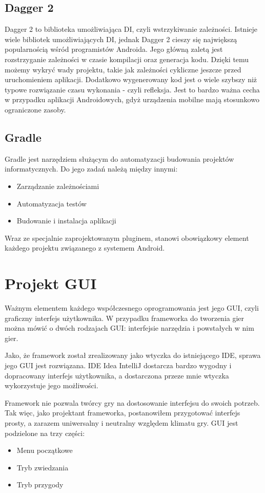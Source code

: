 \documentclass{xmgr}
\begin{document}
\section{Dagger 2}

Dagger 2 \cite{Dagger2:2017:Doc} to biblioteka umożliwiająca DI, czyli wstrzykiwanie zależności. Istnieje wiele bibliotek umożliwiających DI, jednak Dagger 2 cieszy się największą popularnością wśród programistów Androida. Jego główną zaletą jest rozstrzyganie zależności w czasie kompilacji oraz generacja kodu. Dzięki temu możemy wykryć wady projektu, takie jak zależności cykliczne jeszcze przed uruchomieniem aplikacji. Dodatkowo wygenerowany kod jest o wiele szybszy niż typowe rozwiązanie czasu wykonania - czyli refleksja. Jest to bardzo ważna cecha w przypadku aplikacji Androidowych, gdyż urządzenia mobilne mają stosunkowo ograniczone zasoby. 

\section{Gradle}

Gradle \cite{Gradle:2017:Doc} jest narzędziem służącym do automatyzacji budowania projektów informatycznych. Do jego zadań należą między innymi:
\begin{itemize}
	\item Zarządzanie zależnościami
	\item Automatyzacja testów
	\item Budowanie i instalacja aplikacji
\end{itemize}
Wraz ze specjalnie zaprojektowanym pluginem, stanowi obowiązkowy element każdego projektu związanego z systemem Android.

\chapter{Projekt GUI}
Ważnym elementem każdego współczesnego oprogramowania jest jego GUI, czyli graficzny interfejs użytkownika. W przypadku frameworka do tworzenia gier można mówić o dwóch rodzajach GUI: interfejsie narzędzia i powstałych w nim gier. 

Jako, że framework został zrealizowany jako wtyczka do istniejącego IDE, sprawa jego GUI jest rozwiązana. IDE Idea IntelliJ dostarcza bardzo wygodny i dopracowany interfejs użytkownika, a dostarczona przeze mnie wtyczka wykorzystuje jego możliwości. 

Framework nie pozwala twórcy gry na dostosowanie interfejsu do swoich potrzeb. Tak więc, jako projektant frameworka, postanowiłem przygotować interfejs prosty, a zarazem uniwersalny i neutralny względem klimatu gry. GUI jest podzielone na trzy części:
\begin{itemize}
	\item Menu początkowe
	\item Tryb zwiedzania
	\item Tryb przygody
\end{itemize}
\end{document}
